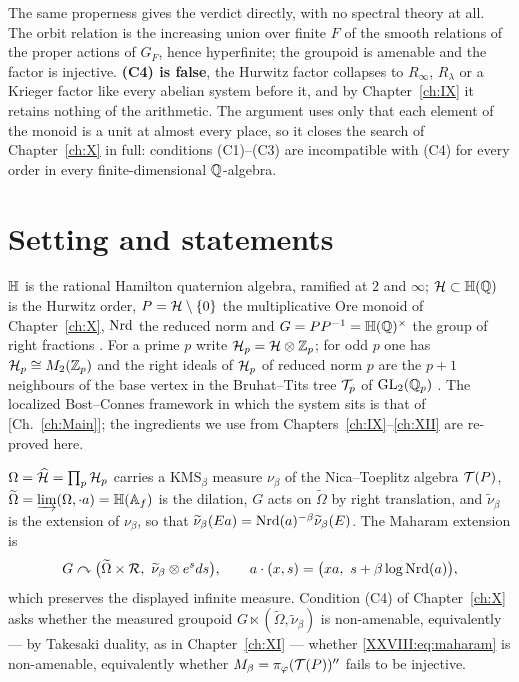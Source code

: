 \begin{summary}
The same properness gives the verdict directly, with no spectral theory at all. The orbit relation
is the increasing union over finite $F$ of the smooth relations of the proper actions of $G_F$,
hence hyperfinite; the groupoid is amenable and the factor is injective. \textbf{(C4) is false},
the Hurwitz factor collapses to $R_\infty$, $R_\lambda$ or a Krieger factor like every abelian
system before it, and by Chapter~\ref{ch:IX} it retains nothing of the arithmetic. The argument uses only
that each element of the monoid is a unit at almost every place, so it closes the search of
Chapter~\ref{ch:X} in full: conditions (C1)--(C3) are incompatible with (C4) for every order in every
finite-dimensional $\mathbb{Q}$-algebra.
\end{summary}


\section{Setting and statements}\label{XXVIII:sec:setup}

$\mathbb{H}$ is the rational Hamilton quaternion algebra, ramified at $2$ and $\infty$;
$\mathcal{H}\subset\mathbb{H}(\mathbb{Q})$ is the Hurwitz order, $P=\mathcal{H}\setminus\{0\}$ the multiplicative Ore monoid of
Chapter~\ref{ch:X}, $\operatorname{Nrd}$ the reduced norm and $G=PP^{-1}=\mathbb{H}(\mathbb{Q})^\times$ the group of right fractions
\cite{Vigneras}. For a prime $p$ write $\mathcal{H}_p=\mathcal{H}\otimes\mathbb{Z}_p$; for odd $p$ one has
$\mathcal{H}_p\cong M_2(\mathbb{Z}_p)$ and the right ideals of $\mathcal{H}_p$ of reduced norm $p$ are the $p+1$ neighbours
of the base vertex in the Bruhat--Tits tree $\mathcal{T}_p$ of $\mathrm{GL}_2(\mathbb{Q}_p)$ \cite{Serre}. The
localized Bost--Connes framework in which the system sits is that of [Ch.~\ref{ch:Main}]; the ingredients
we use from Chapters~\ref{ch:IX}--\ref{ch:XII} are re-proved here.

\begin{hypothesis}\label{XXVIII:hyp:model}
$\Omega=\widehat{\mathcal{H}}=\prod_p\mathcal{H}_p$ carries a $\mathrm{KMS}_\beta$ measure $\nu_\beta$ of the
Nica--Toeplitz algebra $\mathcal{T}(P)$, $\widetilde\Omega=\varinjlim(\Omega,\cdot a)=\mathbb{H}(\mathbb{A}_f)$ is the
dilation, $G$ acts on $\widetilde\Omega$ by right translation, and $\widetilde\nu_\beta$ is the
extension of $\nu_\beta$, so that
$\widetilde\nu_\beta(Ea)=\operatorname{Nrd}(a)^{-\beta}\widetilde\nu_\beta(E)$. The Maharam extension is
\begin{equation}\label{XXVIII:eq:maharam}
G\curvearrowright\bigl(\widetilde\Omega\times\R,\ \widetilde\nu_\beta\otimes e^{s}ds\bigr),
\qquad a\cdot(x,s)=\bigl(xa,\ s+\beta\log\Nrd(a)\bigr),
\end{equation}
which preserves the displayed infinite measure. Condition (C4) of Chapter~\ref{ch:X} asks whether the
measured groupoid $G\ltimes(\widetilde\Omega,\widetilde\nu_\beta)$ is non-amenable, equivalently
--- by Takesaki duality, as in Chapter~\ref{ch:XI} --- whether \eqref{XXVIII:eq:maharam} is non-amenable,
equivalently whether $M_\beta=\pi_\varphi(\mathcal{T}(P))''$ fails to be injective.
\end{hypothesis}

